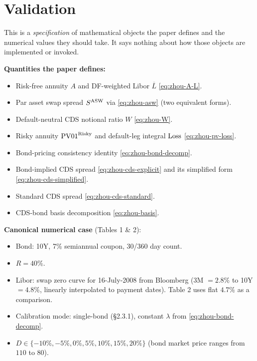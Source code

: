 \documentclass[11pt,a4paper]{article}
\begin{document}
\section{Validation}

\begin{validation}
This is a \emph{specification} of mathematical objects the paper
defines and the numerical values they should take. It says nothing
about how those objects are implemented or invoked.

\textbf{Quantities the paper defines:}
\begin{itemize}[noitemsep]
  \item Risk-free annuity $A$ and DF-weighted Libor $\overline L$ \eqref{eq:zhou-A-L}.
  \item Par asset swap spread $S^{\mathrm{ASW}}$ via \eqref{eq:zhou-asw} (two
        equivalent forms).
  \item Default-neutral CDS notional ratio $W$ \eqref{eq:zhou-W}.
  \item Risky annuity $\mathrm{PV01}^{\text{Risky}}$ and default-leg
        integral $\mathrm{Loss}$ \eqref{eq:zhou-pv-loss}.
  \item Bond-pricing consistency identity \eqref{eq:zhou-bond-decomp}.
  \item Bond-implied CDS spread \eqref{eq:zhou-cds-explicit} and its
        simplified form \eqref{eq:zhou-cds-simplified}.
  \item Standard CDS spread \eqref{eq:zhou-cds-standard}.
  \item CDS-bond basis decomposition \eqref{eq:zhou-basis}.
\end{itemize}

\textbf{Canonical numerical case} (Tables 1 \& 2):
\begin{itemize}[noitemsep]
  \item Bond: 10Y, 7\% semiannual coupon, 30/360 day count.
  \item $R = 40\%$.
  \item Libor: swap zero curve for 16-July-2008 from Bloomberg
        (3M $= 2.8\%$ to 10Y $= 4.8\%$, linearly interpolated to
        payment dates). Table 2 uses flat $4.7\%$ as a comparison.
  \item Calibration mode: single-bond (\S2.3.1), constant $\lambda$
        from \eqref{eq:zhou-bond-decomp}.
  \item $D \in \{-10\%, -5\%, 0\%, 5\%, 10\%, 15\%, 20\%\}$ (bond
        market price ranges from $110$ to $80$).
\end{itemize}


\end{validation}
\end{document}
